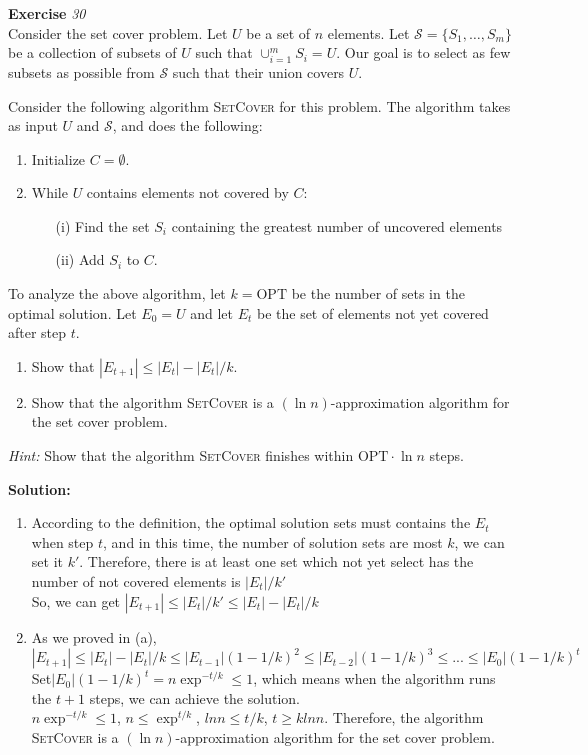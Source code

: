 \documentclass[a4paper,10pt]{article}
\newcounter{aufgc}
\newenvironment{exercise}[1]%
{\refstepcounter{aufgc}\textbf{Exercise \arabic{aufgc}} \emph{#1}\\}
{
	
	\hrulefill\medskip}%
\begin{document}
\begin{exercise}{30}

	Consider the set cover problem. Let $U$ be a set of $n$ elements. Let $\mathcal{S}=\{S_1,\dots,S_m\}$ be a collection of subsets of $U$ such that $\cup_{i=1}^m S_i=U$. Our goal is to select as few subsets as possible from $\mathcal{S}$ such that their union covers $U$.

	Consider the following algorithm \textsc{SetCover} for this problem. The algorithm takes as input $U$ and $\mathcal{S}$, and does the following:
	\begin{enumerate}
		\item Initialize $C=\emptyset$.
		\item While $U$ contains elements not covered by $C$:
		      \begin{enumerate}
			      \item[(i)] Find the set $S_i$ containing the greatest number of uncovered elements
			      \item[(ii)] Add $S_i$ to $C$.
		      \end{enumerate}
	\end{enumerate}

	To analyze the above algorithm, let $k=\mathrm{OPT}$ be the number of sets in the optimal solution. Let $E_0=U$ and let $E_t$ be the set of elements not yet covered after step $t$.
	\begin{enumerate}
		\item Show that $|E_{t+1}|\leq |E_t|-|E_t|/k$.

		\item Show that the algorithm \textsc{SetCover} is a $(\ln n)$-approximation algorithm for the set cover problem.
	\end{enumerate}


	\medskip
	\emph{Hint:} Show that the algorithm \textsc{SetCover} finishes within $\mathrm{OPT}\cdot \ln n$ steps.

	\textbf{Solution: }
	\begin{enumerate}
		\item According to the definition, the optimal solution sets must contains the $E_t$  when step $t$,
		      and in this time, the number of solution sets are most $k$, we can set it $k'$.
		      Therefore, there is at least one set which not yet select has the number of not covered elements is $|E_t|/k'$ \\
		      So, we can get $|E_{t+1}| \le|E_{t}|/k' \le |E_t |- |E_{t}|/k$
		\item As we proved in (a), $|E_{t+1}| \le |E_t |- |E_{t}|/k \le |E_{t-1}|(1- 1/k)^2  \le |E_{t-2}|(1- 1/k)^3 \le ... \le |E_0|(1- 1/k)^t$ \\
		      Set$|E_0|(1- 1/k)^t = n\exp^{-t/k} \le 1$, which means when the algorithm runs the $t+1$ steps, we can achieve the solution.\\
		      $n\exp^{-t/k} \le 1$, $n \le \exp^{t/k}$, $lnn \le t/k$, $t \ge klnn$. Therefore, the algorithm \textsc{SetCover} is a $(\ln n)$-approximation algorithm for the set cover problem.

	\end{enumerate}


\end{exercise}
\end{document}
